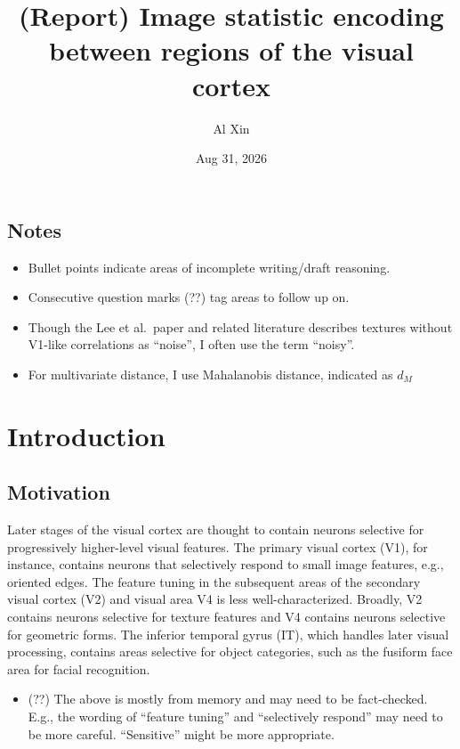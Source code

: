 \documentclass[
  11pt,
  letterpaper,
  DIV=11,
  numbers=noendperiod]{scrartcl}
\title{(Report) Image statistic encoding between regions of the visual
cortex}
\author{\small Al Xin}
\date{Aug 31, 2026}
\providecommand{\tightlist}{%
  \setlength{\itemsep}{0pt}\setlength{\parskip}{0pt}}
\begin{document}
\maketitle


\subsection{Notes}\label{notes}

\begin{itemize}
\tightlist
\item
  Bullet points indicate areas of incomplete writing/draft reasoning.
\item
  Consecutive question marks (??) tag areas to follow up on.
\item
  Though the Lee et al.~paper and related literature describes textures
  without V1-like correlations as ``noise'', I often use the term
  ``noisy''.
\item
  For multivariate distance, I use Mahalanobis distance, indicated as
  \(d_M\)
\end{itemize}

\section{Introduction}\label{introduction}

\subsection{Motivation}\label{motivation}

Later stages of the visual cortex are thought to contain neurons
selective for progressively higher-level visual features. The primary
visual cortex (V1), for instance, contains neurons that selectively
respond to small image features, e.g., oriented edges. The feature
tuning in the subsequent areas of the secondary visual cortex (V2) and
visual area V4 is less well-characterized. Broadly, V2 contains neurons
selective for texture features and V4 contains neurons selective for
geometric forms. The inferior temporal gyrus (IT), which handles later
visual processing, contains areas selective for object categories, such
as the fusiform face area for facial recognition.

\begin{itemize}
\tightlist
\item
  (??) The above is mostly from memory and may need to be fact-checked.
  E.g., the wording of ``feature tuning'' and ``selectively respond''
  may need to be more careful. ``Sensitive'' might be more appropriate.
\end{itemize}
\end{document}
